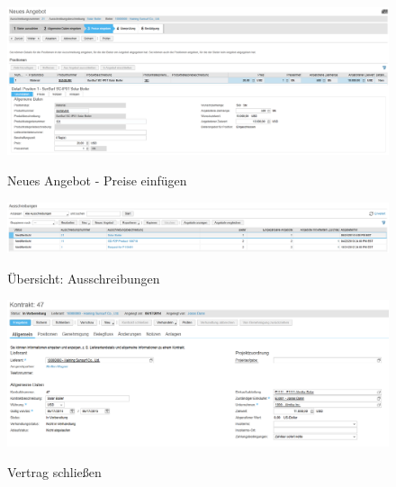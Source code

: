 \begin{figure}[H]
	\begin{center}
	\includegraphics[width=1.0\textwidth]{grafiken/ByDesign-HowTo-Ausschreibung-5.png}
	\caption{Neues Angebot - Preise einfügen}
	\vspace{-10pt}
	\label{abb:byd-rfq-5}
	\end{center}
\end{figure}

\begin{figure}[H]
	\begin{center}
	\includegraphics[width=1.0\textwidth]{grafiken/ByDesign-HowTo-Ausschreibung-6.png}
	\caption{Übersicht: Ausschreibungen}
	\vspace{-10pt}
	\label{abb:byd-rfq-6}
	\end{center}
\end{figure}

\begin{figure}[H]
	\begin{center}
	\includegraphics[width=1.0\textwidth]{grafiken/ByDesign-HowTo-4.png}
	\caption{Vertrag schließen}
	\vspace{-10pt}
	\label{abb:byd-contract}
	\end{center}
\end{figure}

\vspace{-10pt}